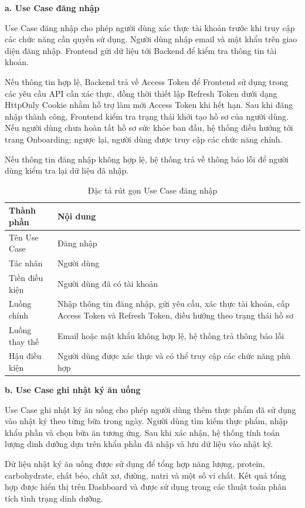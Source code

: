 \documentclass[12pt, a4paper]{report}
\begin{document}
\textbf{a. Use Case đăng nhập}

Use Case đăng nhập cho phép người dùng xác thực tài khoản trước khi truy cập các chức năng cần quyền sử dụng. Người dùng nhập email và mật khẩu trên giao diện đăng nhập. Frontend gửi dữ liệu tới Backend để kiểm tra thông tin tài khoản.

Nếu thông tin hợp lệ, Backend trả về Access Token để Frontend sử dụng trong các yêu cầu API cần xác thực, đồng thời thiết lập Refresh Token dưới dạng HttpOnly Cookie nhằm hỗ trợ làm mới Access Token khi hết hạn. Sau khi đăng nhập thành công, Frontend kiểm tra trạng thái khởi tạo hồ sơ của người dùng. Nếu người dùng chưa hoàn tất hồ sơ sức khỏe ban đầu, hệ thống điều hướng tới trang Onboarding; ngược lại, người dùng được truy cập các chức năng chính.

Nếu thông tin đăng nhập không hợp lệ, hệ thống trả về thông báo lỗi để người dùng kiểm tra lại dữ liệu đã nhập.

\begin{table}[htbp]
\centering
\caption{Đặc tả rút gọn Use Case đăng nhập}
\begin{tabular}{|p{5cm}|p{10cm}|}
\hline
\textbf{Thành phần} & \textbf{Nội dung} \\
\hline
Tên Use Case & Đăng nhập \\
\hline
Tác nhân & Người dùng \\
\hline
Tiền điều kiện & Người dùng đã có tài khoản \\
\hline
Luồng chính & Nhập thông tin đăng nhập, gửi yêu cầu, xác thực tài khoản, cấp Access Token và Refresh Token, điều hướng theo trạng thái hồ sơ \\
\hline
Luồng thay thế & Email hoặc mật khẩu không hợp lệ, hệ thống trả thông báo lỗi \\
\hline
Hậu điều kiện & Người dùng được xác thực và có thể truy cập các chức năng phù hợp \\
\hline
\hline
\hline
\end{tabular}
\end{table}

\textbf{b. Use Case ghi nhật ký ăn uống}

Use Case ghi nhật ký ăn uống cho phép người dùng thêm thực phẩm đã sử dụng vào nhật ký theo từng bữa trong ngày. Người dùng tìm kiếm thực phẩm, nhập khẩu phần và chọn bữa ăn tương ứng. Sau khi xác nhận, hệ thống tính toán lượng dinh dưỡng dựa trên khẩu phần đã nhập và lưu dữ liệu vào nhật ký.

Dữ liệu nhật ký ăn uống được sử dụng để tổng hợp năng lượng, protein, carbohydrate, chất béo, chất xơ, đường, natri và một số vi chất. Kết quả tổng hợp được hiển thị trên Dashboard và được sử dụng trong các thuật toán phân tích tình trạng dinh dưỡng.
\end{document}
